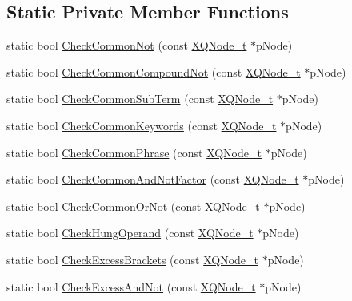 \subsection*{Static Private Member Functions}
\begin{DoxyCompactItemize}
\item 
static bool \hyperlink{classCSphTransformation_a789782fc2ff4f5ffc07b8dc7fac2cd72}{Check\-Common\-Not} (const \hyperlink{structXQNode__t}{X\-Q\-Node\-\_\-t} $\ast$p\-Node)
\item 
static bool \hyperlink{classCSphTransformation_af6eb75405c566736ddccc428657bb89d}{Check\-Common\-Compound\-Not} (const \hyperlink{structXQNode__t}{X\-Q\-Node\-\_\-t} $\ast$p\-Node)
\item 
static bool \hyperlink{classCSphTransformation_a82b63f34c160cccc25ef343624f4fa13}{Check\-Common\-Sub\-Term} (const \hyperlink{structXQNode__t}{X\-Q\-Node\-\_\-t} $\ast$p\-Node)
\item 
static bool \hyperlink{classCSphTransformation_a0127dc64febc9336dedba787cc20a3a1}{Check\-Common\-Keywords} (const \hyperlink{structXQNode__t}{X\-Q\-Node\-\_\-t} $\ast$p\-Node)
\item 
static bool \hyperlink{classCSphTransformation_a630204a4a8f30aaaf5afbbac52db0759}{Check\-Common\-Phrase} (const \hyperlink{structXQNode__t}{X\-Q\-Node\-\_\-t} $\ast$p\-Node)
\item 
static bool \hyperlink{classCSphTransformation_ad6a31470c49c62470e6f449fc122e05e}{Check\-Common\-And\-Not\-Factor} (const \hyperlink{structXQNode__t}{X\-Q\-Node\-\_\-t} $\ast$p\-Node)
\item 
static bool \hyperlink{classCSphTransformation_adf6d3e4db3d2c4200c9e5013bbf37d78}{Check\-Common\-Or\-Not} (const \hyperlink{structXQNode__t}{X\-Q\-Node\-\_\-t} $\ast$p\-Node)
\item 
static bool \hyperlink{classCSphTransformation_a84b0faf19d5ff36bb0e1fa6a87a82aeb}{Check\-Hung\-Operand} (const \hyperlink{structXQNode__t}{X\-Q\-Node\-\_\-t} $\ast$p\-Node)
\item 
static bool \hyperlink{classCSphTransformation_a5abfd421dd83d2599fc7a5615a201bc1}{Check\-Excess\-Brackets} (const \hyperlink{structXQNode__t}{X\-Q\-Node\-\_\-t} $\ast$p\-Node)
\item 
static bool \hyperlink{classCSphTransformation_a7d1e5c33e2b5972e406f49d84c3073c3}{Check\-Excess\-And\-Not} (const \hyperlink{structXQNode__t}{X\-Q\-Node\-\_\-t} $\ast$p\-Node)
\end{DoxyCompactItemize}
